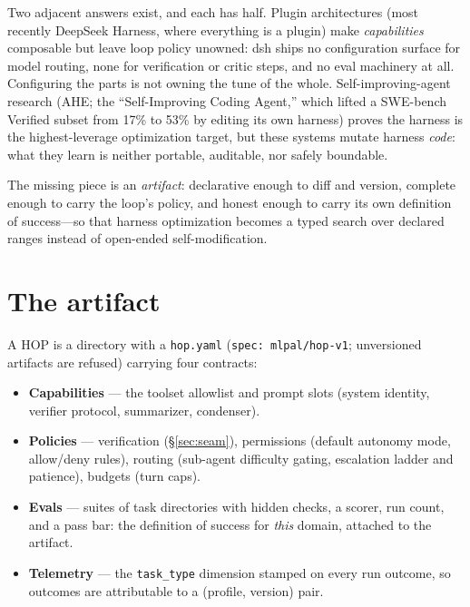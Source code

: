 \documentclass[10pt]{article}
\begin{document}
Two adjacent answers exist, and each has half. Plugin architectures (most recently DeepSeek Harness,
where everything is a plugin) make \emph{capabilities} composable but leave loop policy unowned: dsh
ships no configuration surface for model routing, none for verification or critic steps, and no eval
machinery at all. Configuring the parts is not owning the tune of the whole. Self-improving-agent
research (AHE; the ``Self-Improving Coding Agent,'' which lifted a SWE-bench Verified subset from 17\%
to 53\% by editing its own harness) proves the harness is the highest-leverage optimization target, but
these systems mutate harness \emph{code}: what they learn is neither portable, auditable, nor safely
boundable.

The missing piece is an \emph{artifact}: declarative enough to diff and version, complete enough to
carry the loop's policy, and honest enough to carry its own definition of success---so that harness
optimization becomes a typed search over declared ranges instead of open-ended self-modification.

\section{The artifact}

A HOP is a directory with a \texttt{hop.yaml} (\texttt{spec: mlpal/hop-v1}; unversioned artifacts are
refused) carrying four contracts:

\begin{itemize}[leftmargin=1.4em,itemsep=0.1em]
\item \textbf{Capabilities} --- the toolset allowlist and prompt slots (system identity, verifier
protocol, summarizer, condenser).
\item \textbf{Policies} --- verification (\S\ref{sec:seam}), permissions (default autonomy mode, allow/deny
rules), routing (sub-agent difficulty gating, escalation ladder and patience), budgets (turn caps).
\item \textbf{Evals} --- suites of task directories with hidden checks, a scorer, run count, and a pass
bar: the definition of success for \emph{this} domain, attached to the artifact.
\item \textbf{Telemetry} --- the \texttt{task\_type} dimension stamped on every run outcome, so
outcomes are attributable to a (profile, version) pair.
\end{itemize}
\end{document}
